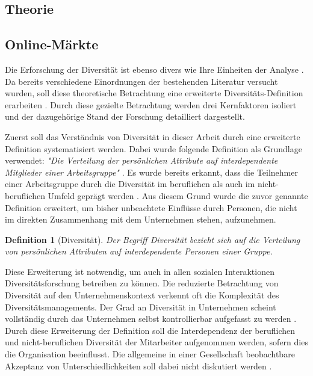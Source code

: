 \documentclass[12pt,a4paper,oneside]{article}
\newtheorem{defi}{Definition}
\begin{document}
\begin{titlepage}
\begin{flushleft}
\newpage
\section{Theorie}
\subsection{Online-Märkte}
Die Erforschung der Diversität ist ebenso divers wie Ihre Einheiten der Analyse \cite[S. 1200]{harrison2007s}. Da bereits verschiedene Einordnungen der bestehenden Literatur versucht wurden, soll diese theoretische Betrachtung eine erweiterte Diversitäts-Definition erarbeiten \cite{jackson2003recent,ashkanasy2002diversity}. Durch diese gezielte Betrachtung werden drei Kernfaktoren isoliert und der dazugehörige Stand der Forschung detailliert dargestellt. 

Zuerst soll das Verständnis von Diversität in dieser Arbeit durch eine erweiterte Definition systematisiert werden. Dabei wurde folgende Definition als Grundlage verwendet: \textit{"Die Verteilung der persönlichen Attribute auf interdependente Mitglieder einer Arbeitsgruppe"} \cite[S. 802]{jackson2003recent}. Es wurde bereits erkannt, dass die Teilnehmer einer Arbeitsgruppe durch die Diversität im beruflichen als auch im nicht-beruflichen Umfeld geprägt werden \cite{van2004work,vashanti2012}. Aus diesem Grund wurde die zuvor genannte Definition erweitert, um bisher unbeachtete Einflüsse durch Personen, die nicht im direkten Zusammenhang mit dem Unternehmen stehen, aufzunehmen.

\begin{defi}[Diversität]
Der Begriff Diversität bezieht sich auf die Ver\-teil\-ung von persönlichen Attributen auf inter\-dependente Personen einer Gruppe.
\end{defi}

Diese Erweiterung ist notwendig, um auch in allen sozialen Interaktionen Diversitätsforschung betreiben zu können. Die reduzierte Betrachtung von Diversität auf den Unternehmenskontext verkennt oft die Komplexität des Diversitätsmanagements. Der Grad an Diversität in Unternehmen scheint vollständig durch das Unternehmen selbst kontrollierbar aufgefasst zu werden \cite{varela2010sinn}. Durch diese Erweiterung der Definition soll die Interdependenz der beruflichen und nicht-beruflichen Diversität der Mitarbeiter aufgenommen werden, sofern dies die Organisation beeinflusst. Die allgemeine in einer Gesellschaft beobachtbare Akzeptanz von Unterschiedlichkeiten soll dabei nicht diskutiert werden \cite{king}.


\end{flushleft}
\end{titlepage}
\end{document}
